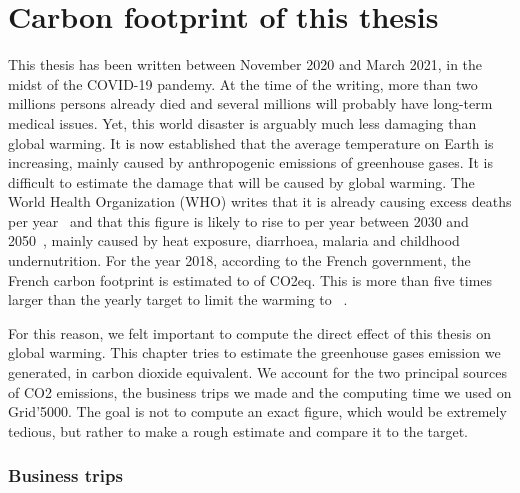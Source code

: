     \lipsum[1]

\chapter{Carbon footprint of this thesis}
\label{chapter:carbon}

    This thesis has been written between November 2020 and March 2021, in the midst of the COVID-19 pandemy. At the time
    of the writing, more than two millions persons already died and several millions will probably have long-term
    medical issues. Yet, this world disaster is arguably much less damaging than global warming. It is now established
    that the average temperature on Earth is increasing, mainly caused by anthropogenic emissions of greenhouse gases.
    It is difficult to estimate the damage that will be caused by global warming. The World Health Organization (WHO)
    writes that it is already causing  excess deaths per year~\cite{who_globalwarming_current} and that this
    figure is likely to rise to  per year between 2030 and 2050~\cite{who_globalwarming_future}, mainly
    caused by heat exposure, diarrhoea, malaria and childhood undernutrition.  For the year 2018, according to the
    French government, the French carbon footprint is estimated to  of CO2eq.  This is more than five
    times larger than the yearly  target to limit the warming to ~\cite{co2_gouv}.

    For this reason, we felt important to compute the direct effect of this thesis on global warming. This chapter tries
    to estimate the greenhouse gases emission we generated, in carbon dioxide equivalent. We account for the two
    principal sources of CO2 emissions, \ie the business trips we made and the computing time we used on Grid'5000.
    The goal is not to compute an exact figure, which would be extremely tedious, but rather to make a rough estimate
    and compare it to the  target.

    \subsection*{Business trips}%

